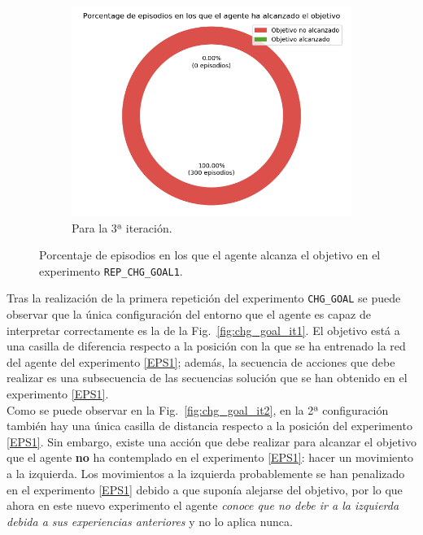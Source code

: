 \begin{figure}
\begin{subfigure}{.5\textwidth}
    \end{subfigure}
    \begin{subfigure}{.5\textwidth}
        \centering
        \includegraphics[scale=0.3]{cap5_experimentacion/images/CHANGE_GOAL-20_09-21_30-0, 2, 1_it3_porcentajeResuelto.png}
        \caption{Para la 3ª iteración.}
        \label{fig:CHANGE_GOAL-20_09-21_30-0, 2, 1_it3_porcentajeResuelto}
    \end{subfigure}%
    \caption{Porcentaje de episodios en los que el agente alcanza el objetivo en el experimento \texttt{REP\_CHG\_GOAL1}.}
    \label{fig:CHANGE_GOAL-20_09-21_30-0, 2, 1_porcentajeResuelto}
\end{figure}

Tras la realización de la primera repetición del experimento \texttt{CHG\_GOAL} se puede observar que la única configuración del entorno que el agente es capaz de interpretar correctamente es la de la Fig.~\ref{fig:chg_goal_it1}. El objetivo está a una casilla de diferencia respecto a la posición con la que se ha entrenado la red del agente del experimento \ref{EPS1}; además, la secuencia de acciones que debe realizar es una subsecuencia de las secuencias solución que se han obtenido en el experimento \ref{EPS1}. \\

Como se puede observar en la Fig.~\ref{fig:chg_goal_it2}, en la 2ª configuración también hay una única casilla de distancia respecto a la posición del experimento \ref{EPS1}. Sin embargo, existe una acción que debe realizar para alcanzar el objetivo que el agente \textbf{no} ha contemplado en el experimento \ref{EPS1}: hacer un movimiento a la izquierda. Los movimientos a la izquierda probablemente se han penalizado en el experimento \ref{EPS1} debido a que suponía alejarse del objetivo, por lo que ahora en este nuevo experimento el agente \textit{conoce que no debe ir a la izquierda debida a sus experiencias anteriores} y no lo aplica nunca. 


